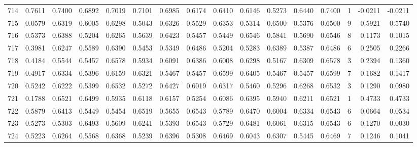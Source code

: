 \begin{tabular}{lrrrrrrrrrrrrrrr}
714 &      0.7611 &  0.7400 &  0.6892 &  0.7019 &  0.7101 &  0.6985 &  0.6174 &  0.6410 &  0.6146 &  0.5273 &   0.6440 &     0.7400 &      1 &                   -0.0211 &                    -0.0211 \\
715 &      0.0579 &  0.6319 &  0.6005 &  0.6298 &  0.5043 &  0.6326 &  0.5529 &  0.6353 &  0.5314 &  0.6500 &   0.5376 &     0.6500 &      9 &                    0.5921 &                     0.5740 \\
716 &      0.5373 &  0.6388 &  0.5204 &  0.6265 &  0.5639 &  0.6423 &  0.5457 &  0.5449 &  0.6546 &  0.5841 &   0.5690 &     0.6546 &      8 &                    0.1173 &                     0.1015 \\
717 &      0.3981 &  0.6247 &  0.5589 &  0.6390 &  0.5453 &  0.5349 &  0.6486 &  0.5204 &  0.5283 &  0.6389 &   0.5387 &     0.6486 &      6 &                    0.2505 &                     0.2266 \\
718 &      0.4184 &  0.5544 &  0.5457 &  0.6578 &  0.5934 &  0.6091 &  0.6386 &  0.6008 &  0.6298 &  0.5167 &   0.6309 &     0.6578 &      3 &                    0.2394 &                     0.1360 \\
719 &      0.4917 &  0.6334 &  0.5396 &  0.6159 &  0.6321 &  0.5467 &  0.5457 &  0.6599 &  0.6405 &  0.5467 &   0.5457 &     0.6599 &      7 &                    0.1682 &                     0.1417 \\
720 &      0.5242 &  0.6222 &  0.5399 &  0.6532 &  0.5272 &  0.6427 &  0.6019 &  0.6317 &  0.5460 &  0.5296 &   0.6268 &     0.6532 &      3 &                    0.1290 &                     0.0980 \\
721 &      0.1788 &  0.6521 &  0.6499 &  0.5935 &  0.6118 &  0.6157 &  0.5254 &  0.6086 &  0.6395 &  0.5940 &   0.6211 &     0.6521 &      1 &                    0.4733 &                     0.4733 \\
722 &      0.5879 &  0.6413 &  0.5449 &  0.5454 &  0.6519 &  0.5655 &  0.6543 &  0.5789 &  0.6470 &  0.6004 &   0.6334 &     0.6543 &      6 &                    0.0664 &                     0.0534 \\
723 &      0.5273 &  0.5303 &  0.6493 &  0.5609 &  0.6241 &  0.5393 &  0.6543 &  0.5729 &  0.6481 &  0.6061 &   0.6315 &     0.6543 &      6 &                    0.1270 &                     0.0030 \\
724 &      0.5223 &  0.6264 &  0.5568 &  0.6368 &  0.5239 &  0.6396 &  0.5308 &  0.6469 &  0.6043 &  0.6307 &   0.5445 &     0.6469 &      7 &                    0.1246 &                     0.1041 \\

\end{tabular}
